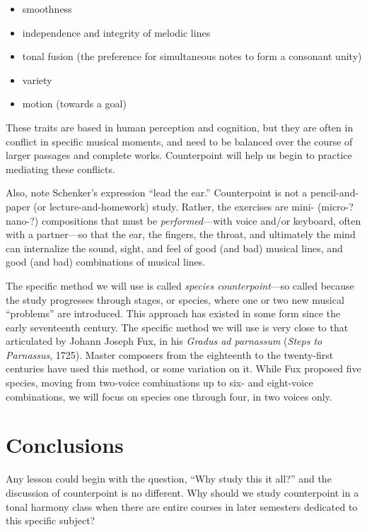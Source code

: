 \documentclass{book}
\providecommand{\tightlist}{%
  \setlength{\itemsep}{0pt}\setlength{\parskip}{0pt}}
\begin{document}
\begin{itemize}
\tightlist
\item
  smoothness\\
\item
  independence and integrity of melodic lines\\
\item
  tonal fusion (the preference for simultaneous notes to form a consonant
  unity)\\
\item
  variety\\
\item
  motion (towards a goal)
\end{itemize}

These traits are based in human perception and cognition, but they are often
in conflict in specific musical moments, and need to be balanced over the
course of larger passages and complete works. Counterpoint will help us begin
to practice mediating these conflicts.

Also, note Schenker's expression ``lead the ear.'' Counterpoint is not a
pencil-and-paper (or lecture-and-homework) study. Rather, the exercises are
mini- (micro-? nano-?) compositions that must be \emph{performed}---with voice
and/or keyboard, often with a partner---so that the ear, the fingers, the
throat, and ultimately the mind can internalize the sound, sight, and feel of
good (and bad) musical lines, and good (and bad) combinations of musical
lines.

The specific method we will use is called \emph{species counterpoint}---so
called because the study progresses through stages, or species, where one or
two new musical ``problems'' are introduced. This approach has existed in some
form since the early seventeenth century. The specific method we will use is
very close to that articulated by Johann Joseph Fux, in his \emph{Gradus ad
parnassum} (\emph{Steps to Parnassus}, 1725). Master composers from the
eighteenth to the twenty-first centuries have used this method, or some
variation on it. While Fux proposed five species, moving from two-voice
combinations up to six- and eight-voice combinations, we will focus on species
one through four, in two voices only.

\hypertarget{conclusions}{%
\section{Conclusions}\label{conclusions}}

Any lesson could begin with the question, ``Why study this it all?'' and the
discussion of counterpoint is no different. Why should we study counterpoint
in a tonal harmony class when there are entire courses in later semesters
dedicated to this specific subject?
\end{document}
